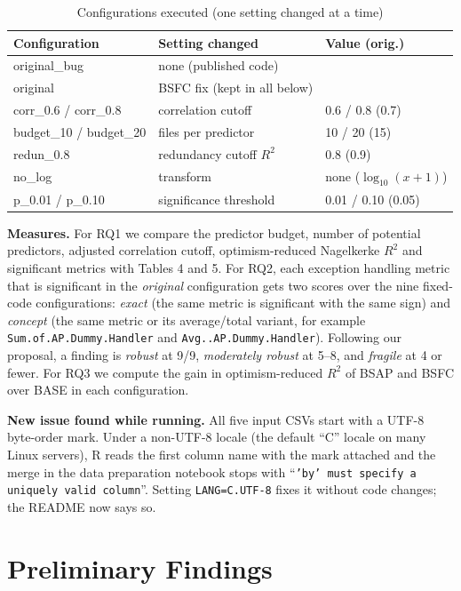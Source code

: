 \documentclass[conference]{IEEEtran}
\begin{document}
\begin{table}[!h]
\centering
\caption{Configurations executed (one setting changed at a time)}
\label{tab:configs}
\footnotesize
\setlength{\tabcolsep}{4pt}
\begin{tabular}{@{}lll@{}}
\toprule
Configuration & Setting changed & Value (orig.) \\
\midrule
original\_bug & none (published code) & \\
original & BSFC fix (kept in all below) & \\
corr\_0.6 / corr\_0.8 & correlation cutoff & 0.6 / 0.8 (0.7) \\
budget\_10 / budget\_20 & files per predictor & 10 / 20 (15) \\
redun\_0.8 & redundancy cutoff $R^2$ & 0.8 (0.9) \\
no\_log & transform & none ($\log_{10}(x+1)$) \\
p\_0.01 / p\_0.10 & significance threshold & 0.01 / 0.10 (0.05) \\
\bottomrule
\end{tabular}
\end{table}

\textbf{Measures.} For RQ1 we compare the predictor budget, number of potential predictors, adjusted correlation cutoff, optimism-reduced Nagelkerke $R^2$ and significant metrics with Tables 4 and 5. For RQ2, each exception handling metric that is significant in the \emph{original} configuration gets two scores over the nine fixed-code configurations: \emph{exact} (the same metric is significant with the same sign) and \emph{concept} (the same metric or its average/total variant, for example \texttt{Sum.of.AP.Dummy.Handler} and \texttt{Avg..AP.Dummy.Handler}). Following our proposal, a finding is \emph{robust} at 9/9, \emph{moderately robust} at 5--8, and \emph{fragile} at 4 or fewer. For RQ3 we compute the gain in optimism-reduced $R^2$ of BSAP and BSFC over BASE in each configuration.

\textbf{New issue found while running.} All five input CSVs start with a UTF-8 byte-order mark. Under a non-UTF-8 locale (the default ``C'' locale on many Linux servers), R reads the first column name with the mark attached and the merge in the data preparation notebook stops with ``\texttt{'by' must specify a uniquely valid column}''. Setting \texttt{LANG=C.UTF-8} fixes it without code changes; the README now says so.

\section{Preliminary Findings}
\end{document}
